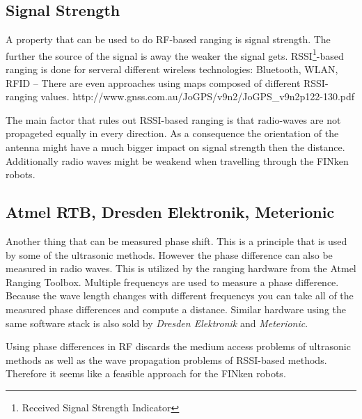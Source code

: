 \subsection{Signal Strength}

A property that can be used to do RF-based ranging is signal strength.
The further the source of the signal is away the weaker the signal gets.
RSSI\footnote{Received Signal Strength Indicator}-based ranging is done for serveral different wireless technologies: Bluetooth, WLAN, RFID –
There are even approaches using maps composed of different RSSI-ranging values. http://www.gnss.com.au/JoGPS/v9n2/JoGPS\_v9n2p122-130.pdf 

The main factor that rules out RSSI-based ranging is that radio-waves are not propageted equally in every direction. 
As a consequence the orientation of the antenna might have a much bigger impact on signal strength then the distance.
Additionally radio waves might be weakend when travelling through the FINken robots.

\subsection{Atmel RTB, Dresden Elektronik, Meterionic}

Another thing that can be measured phase shift.
This is a principle that is used by some of the ultrasonic methods.
However the phase difference can also be measured in radio waves.
This is utilized by the ranging hardware from the Atmel Ranging Toolbox.
Multiple frequencys are used to measure a phase difference.
Because the wave length changes with different frequencys you can take all of the measured phase differences and compute a distance.
Similar hardware using the same software stack is also sold by \emph{Dresden Elektronik} and \emph{Meterionic}.

Using phase differences in RF discards the medium access problems of ultrasonic methods as well as the wave propagation problems of RSSI-based methods.
Therefore it seems like a feasible approach for the FINken robots.


